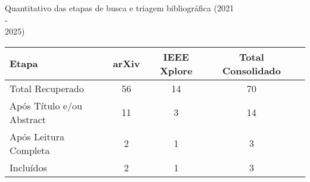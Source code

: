 \begin{quadro}[H]
\centering
\caption{Quantitativo das etapas de busca 
e triagem bibliográfica (2021\\-\\2025)}
\label{quadro:busca_invertido}
\begin{tabular}{|l|c|c|c|c|}
\hline
\textbf{Etapa} & \textbf{arXiv} & \textbf{IEEE Xplore}  & \textbf{Total Consolidado} \\
\hline
Total Recuperado & 56 & 14 & 70 \\
Após Título e/ou Abstract & 11 & 3 & 14 \\
Após Leitura Completa & 2 & 1 & 3 \\
\hline
Incluídos & 2 & 1 & 3 \\
\hline
\end{tabular}
\end{quadro}